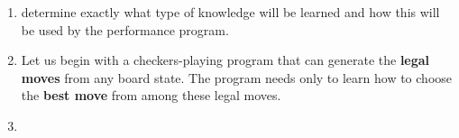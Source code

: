 \begin{enumerate}[itemsep=0.2cm]
    \item determine exactly what type of knowledge will be learned and how this will be used by the performance program.
    \hfill \cite{ml/book/Machine-Learning/Tom-M-Mitchell}

    \item Let us begin with a checkers-playing program that can generate the \textbf{legal moves} from any board state. The program needs only to learn how to choose the \textbf{best move} from among these legal moves.
    \hfill \cite{ml/book/Machine-Learning/Tom-M-Mitchell}

    \item 
    \hfill \cite{ml/book/Machine-Learning/Tom-M-Mitchell}

    
\end{enumerate}





































